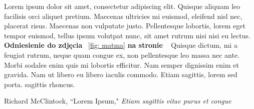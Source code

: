 \documentclass[12pt,a4paper]{article}
\begin{document}
	Lorem ipsum dolor sit amet, consectetur adipiscing elit. Quisque aliquam leo facilisis orci aliquet pretium. Maecenas ultricies mi euismod, eleifend nisl nec, placerat risus. Maecenas non vulputate justo. Pellentesque lobortis, lorem eget tempor euismod, tellus ipsum volutpat nunc, sit amet rutrum nisi nisi eu lectus.  \textbf{Odniesienie do zdjęcia} ~\ref{fig: matma} \textbf{na stronie} ~\pageref{fig: matma} Quisque dictum, mi a feugiat rutrum, neque quam congue ex, non pellentesque leo massa nec ante. Morbi sodales enim quis mi lobortis efficitur. Nam semper dignissim enim et gravida. Nam ut libero eu libero iaculis commodo. Etiam sagittis, lorem sed porta. sagittis rhoncus.
	
	\newpage
	\begin{thebibliography}{10}
		Richard McClintock, ``Lorem Ipsum," \emph{Etiam sagittis vitae purus et congue}

	\end{thebibliography}
	
\end{document}
